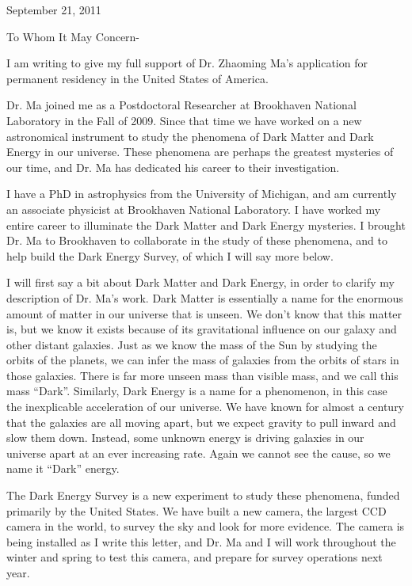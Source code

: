 \documentclass[12pt]{letter}
\begin{document}
\hfill September 21,  2011
\newline

To Whom It May Concern-

I am writing to give my full support of Dr. Zhaoming Ma's application for
permanent residency in the United States of America.

Dr. Ma joined me as a Postdoctoral Researcher at Brookhaven National Laboratory
in the Fall of 2009.  Since that time we have worked on a new astronomical
instrument to study the phenomena of Dark Matter and Dark Energy in our
universe.  These phenomena are perhaps the greatest mysteries of our time, and
Dr. Ma has dedicated his career to their investigation.

I have a PhD in astrophysics from the University of Michigan, and am currently
an associate physicist at Brookhaven National Laboratory.  I have worked my
entire career to illuminate the Dark Matter and Dark Energy mysteries.  I
brought Dr. Ma to Brookhaven to collaborate in the study of these phenomena,
and to help build the Dark Energy Survey, of which I will say more below.

I will first say a bit about Dark Matter and Dark Energy, in order to clarify
my description of Dr. Ma's work.  Dark Matter is essentially a name for the
enormous amount of matter in our universe that is unseen.  We don't know that
this matter is, but we know it exists because of its gravitational influence on
our galaxy and other distant galaxies.  Just as we know the mass of the Sun by
studying the orbits of the planets, we can infer the mass of galaxies from the
orbits of stars in those galaxies.  There is far more unseen mass than visible
mass, and we call this mass ``Dark''.  Similarly, Dark Energy is a name for a
phenomenon, in this case the inexplicable acceleration of our universe. We have
known for almost a century that the galaxies are all moving apart, but we
expect gravity to pull inward and slow them down.  Instead, some unknown energy
is driving galaxies in our universe apart at an ever increasing rate.  Again
we cannot see the cause, so we name it ``Dark'' energy.

The Dark Energy Survey is a new experiment to study these phenomena, funded
primarily by the United States.  We have built a new camera, the largest CCD
camera in the world, to survey the sky and look for more evidence.  The camera
is being installed as I write this letter, and Dr. Ma and I will work
throughout the winter and spring to test this camera, and prepare for survey
operations next year.
\end{document}
